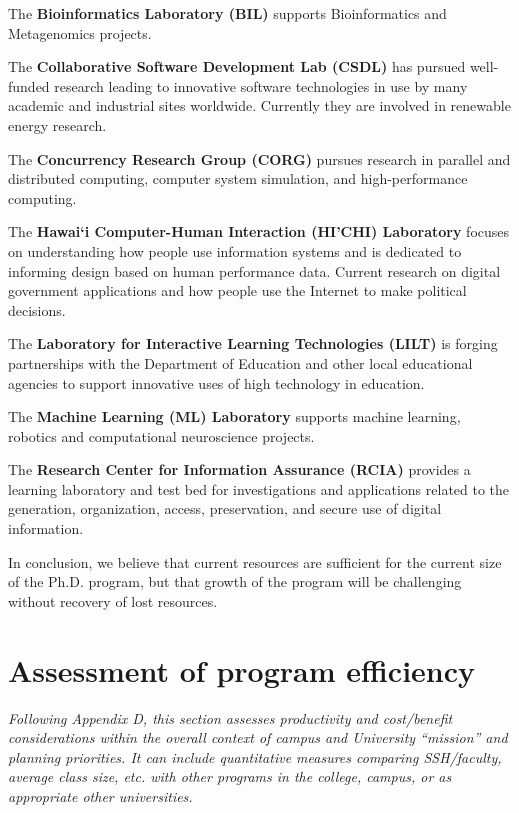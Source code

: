 \documentclass[12pt]{article}
\begin{document}
\medskip\noindent The {\bf Bioinformatics Laboratory (BIL)} supports Bioinformatics and
Metagenomics projects.

\medskip\noindent The {\bf Collaborative Software Development Lab (CSDL)} has pursued
well-funded research leading to innovative software technologies in use by
many academic and industrial sites worldwide.  Currently they are involved
in renewable energy research. 

\medskip\noindent The {\bf Concurrency Research Group (CORG)} pursues research in  parallel
and distributed computing, computer system simulation, and high-performance
computing.

\medskip\noindent The {\bf Hawai`i Computer-Human Interaction (HI'CHI) Laboratory} focuses on
understanding how people use information systems and is dedicated to
informing design based on human performance data. Current research on
digital government applications and how people use the Internet to make
political decisions.

\medskip\noindent The {\bf Laboratory for Interactive Learning Technologies (LILT)} is
forging partnerships with the Department of Education and other local
educational agencies to support innovative uses of high technology in
education.

\medskip\noindent The {\bf Machine Learning (ML) Laboratory} supports machine learning,
robotics and computational neuroscience projects.

\medskip\noindent The {\bf Research Center for Information Assurance (RCIA)} provides a
learning laboratory and test bed for investigations and applications
related to the generation, organization, access, preservation, and secure
use of digital information.


In conclusion, we believe that current resources are sufficient for the
current size of the Ph.D. program, but that growth of the program will be
challenging without recovery of lost resources.




\section{Assessment of program efficiency}

{\em Following Appendix D, this section assesses productivity and
  cost/benefit considerations within the overall context of campus and
  University ``mission'' and planning priorities.  It can include
  quantitative measures comparing SSH/faculty, average class size,
  etc. with other programs in the college, campus, or as appropriate other
  universities.}
\end{document}
